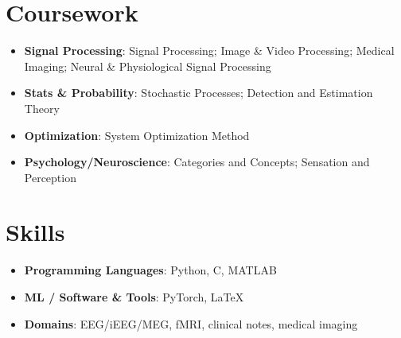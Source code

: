\documentclass[letterpaper,11pt]{article}
\newcommand{\resumeSubHeadingListStart}{\begin{itemize}[leftmargin=*]}
\newcommand{\resumeSubHeadingListEnd}{\end{itemize}}
\begin{document}
\section{Coursework}
  \resumeSubHeadingListStart
    \item\small{
      \textbf{Signal Processing}{: Signal Processing; Image \& Video Processing; Medical Imaging; Neural \& Physiological Signal Processing}
    }
    \item\small{
      \textbf{Stats \& Probability}{: Stochastic Processes; Detection and Estimation Theory}
    }
    \item\small{
      \textbf{Optimization}{: System Optimization Method}
    }
    \item\small{
      \textbf{Psychology/Neuroscience}{: Categories and Concepts; Sensation and Perception}
    }
  \resumeSubHeadingListEnd

\section{Skills}
 \resumeSubHeadingListStart
    \item{
      \textbf{Programming Languages}{: Python, C, MATLAB}
    }
    \item{
      \textbf{ML / Software \& Tools}{: PyTorch, LaTeX}
    }
    \item{
      \textbf{Domains}{: EEG/iEEG/MEG, fMRI, clinical notes, medical imaging}
    }
 \resumeSubHeadingListEnd

\end{document}
